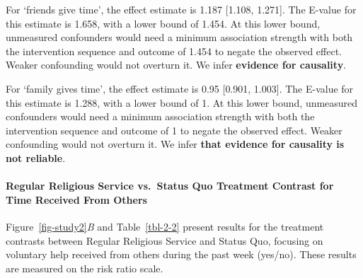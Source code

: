 \documentclass[
  single column]{article}
\let\oldparagraph\paragraph
\renewcommand{\paragraph}[1]{\oldparagraph{#1}\mbox{}}
\begin{document}
For `friends give time', the effect estimate is 1.187 {[}1.108,
1.271{]}. The E-value for this estimate is 1.658, with a lower bound of
1.454. At this lower bound, unmeasured confounders would need a minimum
association strength with both the intervention sequence and outcome of
1.454 to negate the observed effect. Weaker confounding would not
overturn it. We infer \textbf{evidence for causality}.

For `family gives time', the effect estimate is 0.95 {[}0.901, 1.003{]}.
The E-value for this estimate is 1.288, with a lower bound of 1. At this
lower bound, unmeasured confounders would need a minimum association
strength with both the intervention sequence and outcome of 1 to negate
the observed effect. Weaker confounding would not overturn it. We infer
\textbf{that evidence for causality is not reliable}.

\paragraph{Regular Religious Service vs.~Status Quo Treatment Contrast
for Time Received From
Others}\label{regular-religious-service-vs.-status-quo-treatment-contrast-for-time-received-from-others}

Figure~\ref{fig-study2}\emph{B} and Table~\ref{tbl-2-2} present results
for the treatment contrasts between Regular Religious Service and Status
Quo, focusing on voluntary help received from others during the past
week (yes/no). These results are measured on the risk ratio scale.
\end{document}
